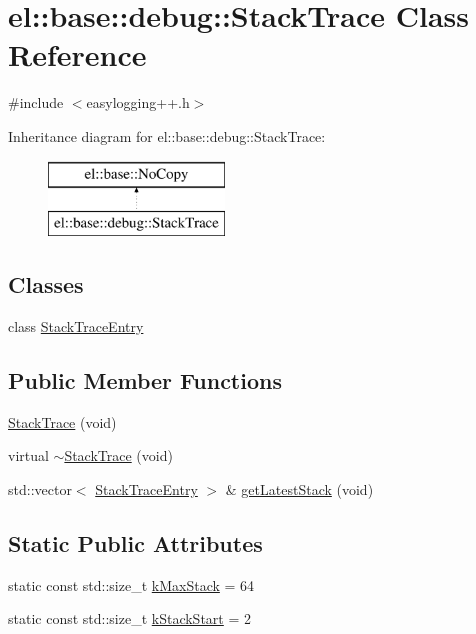 \hypertarget{classel_1_1base_1_1debug_1_1_stack_trace}{}\section{el\+:\+:base\+:\+:debug\+:\+:Stack\+Trace Class Reference}
\label{classel_1_1base_1_1debug_1_1_stack_trace}


{\ttfamily \#include $<$easylogging++.\+h$>$}

Inheritance diagram for el\+:\+:base\+:\+:debug\+:\+:Stack\+Trace\+:\begin{figure}[H]
\begin{center}
\leavevmode
\includegraphics[height=2.000000cm]{classel_1_1base_1_1debug_1_1_stack_trace}
\end{center}
\end{figure}
\subsection*{Classes}
\begin{DoxyCompactItemize}
\item 
class \hyperlink{classel_1_1base_1_1debug_1_1_stack_trace_1_1_stack_trace_entry}{Stack\+Trace\+Entry}
\end{DoxyCompactItemize}
\subsection*{Public Member Functions}
\begin{DoxyCompactItemize}
\item 
\hyperlink{classel_1_1base_1_1debug_1_1_stack_trace_a6921f2bb2ecf1830c371e554d8e5b587}{Stack\+Trace} (void)
\item 
virtual \hyperlink{classel_1_1base_1_1debug_1_1_stack_trace_afd779a4600e05db6398dc6f19d71f66a}{$\sim$\+Stack\+Trace} (void)
\item 
std\+::vector$<$ \hyperlink{classel_1_1base_1_1debug_1_1_stack_trace_1_1_stack_trace_entry}{Stack\+Trace\+Entry} $>$ \& \hyperlink{classel_1_1base_1_1debug_1_1_stack_trace_a8b6a4f154b59d597b73fe8a515df3240}{get\+Latest\+Stack} (void)
\end{DoxyCompactItemize}
\subsection*{Static Public Attributes}
\begin{DoxyCompactItemize}
\item 
static const std\+::size\+\_\+t \hyperlink{classel_1_1base_1_1debug_1_1_stack_trace_a6e3db7fdc258a7d653f00fc5aade55c2}{k\+Max\+Stack} = 64
\item 
static const std\+::size\+\_\+t \hyperlink{classel_1_1base_1_1debug_1_1_stack_trace_ab8a89fe5c4f779d3e685a5e61f1136e2}{k\+Stack\+Start} = 2
\end{DoxyCompactItemize}
